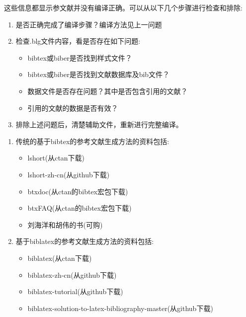 
这些信息都显示参文献并没有编译正确。可以从以下几个步骤进行检查和排除:
\begin{enumerate}
\item 是否正确完成了编译步骤？编译方法见上一问题

\item 检查.blg文件内容，看是否存在如下问题:

\begin{itemize}
  \item bibtex或biber是否找到样式文件？
  \item bibtex或biber是否找到文献数据库及bib文件？
  \item 数据文件是否存在问题？其中是否包含引用的文献？
  \item 引用的文献的数据是否有效？
\end{itemize}

\item 排除上述问题后，清楚辅助文件，重新进行完整编译。

\end{enumerate}




\begin{enumerate}
\item 传统的基于bibtex的参考文献生成方法的资料包括:

\begin{itemize}
  \item lshort(从ctan下载)
  \item lshort-zh-cn(从github下载)
  \item btxdoc(从ctan的bibtex宏包下载)
  \item btxFAQ(从ctan的bibtex宏包下载)
  \item 刘海洋和胡伟的书(可购)
\end{itemize}

\item 基于biblatex的参考文献生成方法的资料包括:

\begin{itemize}
  \item biblatex(从ctan下载)
  \item biblatex-zh-cn(从github下载)
  \item biblatex-tutorial(从github下载)
  \item biblatex-solution-to-latex-bibliography-master(从github下载)
\end{itemize}

\end{enumerate}

